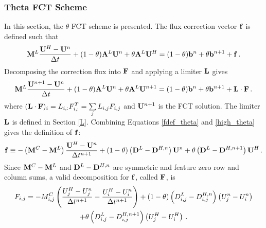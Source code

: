 \subsubsection{Theta FCT Scheme}
In this section, the $\theta$ FCT scheme is presented.
The flux correction vector $\mathbf{f}$ is defined such that
\begin{equation}\label{fdef_theta}
  \mathbf{M}^L\frac{\mathbf{U}^H-\mathbf{U}^n}{\Delta t}
  + (1-\theta)\mathbf{A}^L\mathbf{U}^n + \theta\mathbf{A}^L\mathbf{U}^H
  = (1-\theta)\mathbf{b}^n + \theta\mathbf{b}^{n+1} + \mathbf{f} \,.
\end{equation}
Decomposing the correction flux into $\mathbf{F}$ and applying a limiter $\mathbf{L}$ gives
\begin{equation}\label{limited_theta}
  \mathbf{M}^L\frac{\mathbf{U}^{n+1}-\mathbf{U}^n}{\Delta t}
  + (1-\theta)\mathbf{A}^L\mathbf{U}^n + \theta\mathbf{A}^L\mathbf{U}^{n+1}
  = (1-\theta)\mathbf{b}^n + \theta\mathbf{b}^{n+1} + \mathbf{L}\cdot\mathbf{F} \,.
\end{equation}
where $(\mathbf{L}\cdot\mathbf{F})_i = L_{i,:}F_{i,:}^T = \sum\limits_j L_{i,j} F_{i,j}$
and $\mathbf{U}^{n+1}$ is the FCT solution. The limiter $\mathbf{L}$ is
defined in Section \ref{L}.
Combining Equations \eqref{fdef_theta} and \eqref{high_theta}
gives the definition of $\mathbf{f}$:
\begin{equation}\label{f_theta}
   \mathbf{f} \equiv -\left(\mathbf{M}^C-\mathbf{M}^L\right)\frac{\mathbf{U}^H-\mathbf{U}^n}{\Delta t^{n+1}}
   + (1-\theta)\left(\mathbf{D}^L-\mathbf{D}^{H,n}\right)\mathbf{U}^n 
   + \theta    \left(\mathbf{D}^L-\mathbf{D}^{H,n+1}\right)\mathbf{U}^H \,.
\end{equation}
Since $\mathbf{M}^C-\mathbf{M}^L$ and $\mathbf{D}^L-\mathbf{D}^{H,n}$ are symmetric
and feature zero row and column sums, a valid decomposition for $\mathbf{f}$,
called $\mathbf{F}$, is
\begin{multline}
   F_{i,j} = -M^C_{i,j}\left(\frac{U_j^H - U_j^n}{\Delta t^{n+1}}
   - \frac{U_i^H - U_i^n}{\Delta t^{n+1}}\right)
   + (1-\theta)\left(D_{i,j}^L-D_{i,j}^{H,n}\right)  \left(U_j^n - U_i^n\right)\\
   + \theta    \left(D_{i,j}^L-D_{i,j}^{H,n+1}\right)\left(U_j^H - U_i^H\right) \,.
\end{multline}
%

